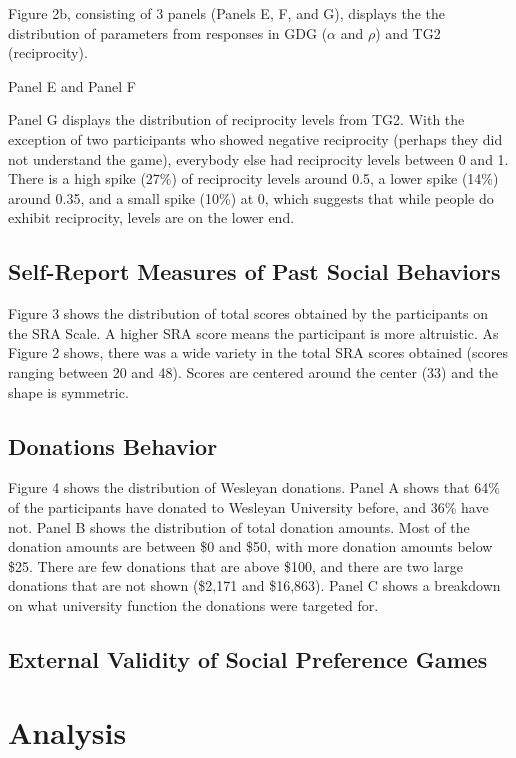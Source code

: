 \documentclass{article}
\begin{document}
Figure 2b, consisting of 3 panels (Panels E, F, and G), displays the the distribution of parameters from responses in GDG (\(\alpha\) and \(\rho\)) and TG2 (reciprocity).

{\color{red} Panel E and Panel F}

Panel G displays the distribution of reciprocity levels from TG2. With the exception of two participants who showed negative reciprocity (perhaps they did not understand the game), everybody else had reciprocity levels between 0 and 1. There is a high spike (27\%) of reciprocity levels around 0.5, a lower spike (14\%) around 0.35, and a small spike (10\%) at 0, which suggests that while people do exhibit reciprocity, levels are on the lower end.


\subsection{Self-Report Measures of Past Social Behaviors}

Figure 3 shows the distribution of total scores obtained by the participants on the SRA Scale. A higher SRA score means the participant is more altruistic. As Figure 2 shows, there was a wide variety in the total SRA scores obtained (scores ranging between 20 and 48). Scores are centered around the center (33) and the shape is symmetric.

\subsection{Donations Behavior}

Figure 4 shows the distribution of Wesleyan donations. Panel A shows that 64\% of the participants have donated to Wesleyan University before, and 36\% have not. Panel B shows the distribution of total donation amounts. Most of the donation amounts are between \$0 and \$50, with more donation amounts below \$25. There are few donations that are above \$100, and there are two large donations that are not shown (\$2,171 and \$16,863). Panel C shows a breakdown on what university function the donations were targeted for.

\subsection{External Validity of Social Preference Games}




\section{Analysis}
\end{document}

